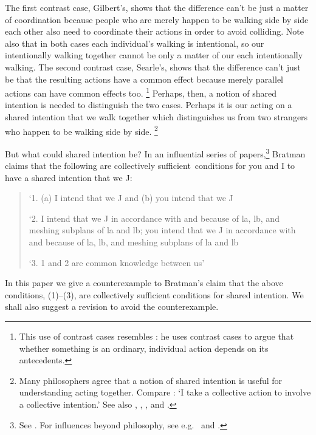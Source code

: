 \documentclass[12pt,\papersize]{extarticle}
\begin{document}
The first contrast case, Gilbert's, shows that the difference can’t be just  a matter of coordination because people who are merely happen to be walking side by side each other also need to coordinate their actions in order to avoid colliding.  
Note also that in both cases each individual's walking is intentional, so our intentionally walking together cannot be  only a matter of our each intentionally walking.
The second contrast case, Searle's, shows that the difference can’t just be that the resulting actions have a common effect because merely parallel actions can have common effects too.%
\footnote{
This use of contrast cases resembles \citet{Pears:1971fk}: he uses contrast cases to argue that whether something is an ordinary, individual action depends on its antecedents. 
} 
Perhaps, then, a notion of shared intention is needed to distinguish the two cases.  
Perhaps it is our acting on a shared intention that we walk together which distinguishes us from two strangers who happen to be walking side by side.%
\footnote{
Many philosophers agree that a notion of shared intention is useful for understanding acting together. 
Compare \citet[p.\ 5]{Gilbert:2006wr}: `I take a collective action to involve a collective intention.'  See also  
	\citet[p.\ 381]{Carpenter:2009wq}, 
	\citet[p.\ 369]{Call:2009fk}, 
	\citet{Kutz:2000si}, 
	\citet[p.\ 117]{rakoczy_pretend_2006} and 
	\citet{Tollefsen:2005vh}.
	}
	

But what could shared intention be?
In an influential series of papers,\footnote{ 
See \citet{Bratman:1992mi,Bratman:1993je,Bratman:1999fr,Bratman:2009lv}.
For influences beyond philosophy, see e.g.\ \citet{Tomasello:2005wx} and \citet{Knoblich:2008hy}. 
}
Bratman claims that the following are collectively sufficient\footnotemark \ conditions for you and I to have a shared intention that we J:
%
%
\begin{quote}
\label{quote:bratman_account}
`1. (a) I intend that we J and (b) you intend that we J
 
`2. I intend that we J in accordance with and because of la, lb, and meshing subplans of la and lb; you intend that we J in accordance with and because of la, lb, and meshing subplans of la and lb
 
`3. 1 and 2 are common knowledge between us' \citep[][p.\ View 4]{Bratman:1993je}
\end{quote}
%
In this paper we give a counterexample to Bratman's  claim that the above conditions, (1)--(3), are collectively sufficient conditions for shared intention. 
We shall also suggest a revision to avoid the counterexample.
\end{document}
